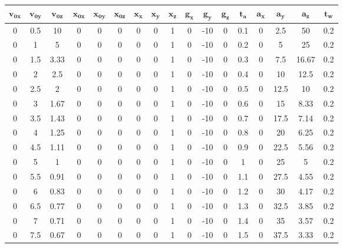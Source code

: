 \begin{tabular}{| c | c | c | c | c | c | c | c | c | c | c | c | c | c | c | c | c |}
	\hline
	$\mathbf{v_{0x}}$ & $\mathbf{v_{0y}}$ & $\mathbf{v_{0z}}$ & $\mathbf{x_{0x}}$ & $\mathbf{x_{0y}}$ & $\mathbf{x_{0z}}$ & $\mathbf{x_x}$ & $\mathbf{x_y}$ & $\mathbf{x_z}$ & $\mathbf{g_x}$ & $\mathbf{g_y}$ & $\mathbf{g_z}$ & $\mathbf{t_a}$ & $\mathbf{a_x}$ & $\mathbf{a_y}$ & $\mathbf{a_z}$ & $\mathbf{t_w}$ \\ \hline
	0 & 0.5 & 10 & 0 & 0 & 0 & 0 & 0 & 1 & 0 & -10 & 0 & 0.1 & 0 & 2.5 & 50 & 0.2 \\ \hline
	0 & 1 & 5 & 0 & 0 & 0 & 0 & 0 & 1 & 0 & -10 & 0 & 0.2 & 0 & 5 & 25 & 0.2 \\ \hline
	0 & 1.5 & 3.33 & 0 & 0 & 0 & 0 & 0 & 1 & 0 & -10 & 0 & 0.3 & 0 & 7.5 & 16.67 & 0.2 \\ \hline
	0 & 2 & 2.5 & 0 & 0 & 0 & 0 & 0 & 1 & 0 & -10 & 0 & 0.4 & 0 & 10 & 12.5 & 0.2 \\ \hline
	0 & 2.5 & 2 & 0 & 0 & 0 & 0 & 0 & 1 & 0 & -10 & 0 & 0.5 & 0 & 12.5 & 10 & 0.2 \\ \hline
	0 & 3 & 1.67 & 0 & 0 & 0 & 0 & 0 & 1 & 0 & -10 & 0 & 0.6 & 0 & 15 & 8.33 & 0.2 \\ \hline
	0 & 3.5 & 1.43 & 0 & 0 & 0 & 0 & 0 & 1 & 0 & -10 & 0 & 0.7 & 0 & 17.5 & 7.14 & 0.2 \\ \hline
	0 & 4 & 1.25 & 0 & 0 & 0 & 0 & 0 & 1 & 0 & -10 & 0 & 0.8 & 0 & 20 & 6.25 & 0.2 \\ \hline
	0 & 4.5 & 1.11 & 0 & 0 & 0 & 0 & 0 & 1 & 0 & -10 & 0 & 0.9 & 0 & 22.5 & 5.56 & 0.2 \\ \hline
	0 & 5 & 1 & 0 & 0 & 0 & 0 & 0 & 1 & 0 & -10 & 0 & 1 & 0 & 25 & 5 & 0.2 \\ \hline
	0 & 5.5 & 0.91 & 0 & 0 & 0 & 0 & 0 & 1 & 0 & -10 & 0 & 1.1 & 0 & 27.5 & 4.55 & 0.2 \\ \hline
	0 & 6 & 0.83 & 0 & 0 & 0 & 0 & 0 & 1 & 0 & -10 & 0 & 1.2 & 0 & 30 & 4.17 & 0.2 \\ \hline
	0 & 6.5 & 0.77 & 0 & 0 & 0 & 0 & 0 & 1 & 0 & -10 & 0 & 1.3 & 0 & 32.5 & 3.85 & 0.2 \\ \hline
	0 & 7 & 0.71 & 0 & 0 & 0 & 0 & 0 & 1 & 0 & -10 & 0 & 1.4 & 0 & 35 & 3.57 & 0.2 \\ \hline
	0 & 7.5 & 0.67 & 0 & 0 & 0 & 0 & 0 & 1 & 0 & -10 & 0 & 1.5 & 0 & 37.5 & 3.33 & 0.2 \\ \hline
\end{tabular}